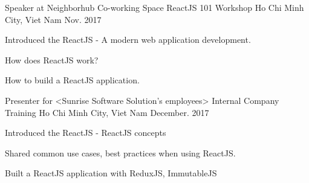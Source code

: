 

\begin{cventries}

  \cventry
    {Speaker at Neighborhub Co-working Space} %
    {ReactJS 101 Workshop} %
    {Ho Chi Minh City, Viet Nam} %
    {Nov. 2017} %
    {
      \begin{cvitems} %
        \item {Introduced the ReactJS - A modern web application development.}
        \item {How does ReactJS work?}
        \item {How to build a ReactJS application.}
      \end{cvitems}
    }

  \cventry
    {Presenter for <Sunrise Software Solution's employees>} %
    {Internal Company Training} %
    {Ho Chi Minh City, Viet Nam} %
    {December. 2017} %
    {
      \begin{cvitems} %
        \item {Introduced the ReactJS - ReactJS concepts}
        \item {Shared common use cases, best practices when using ReactJS.}
        \item {Built a ReactJS application with ReduxJS, ImmutableJS}
      \end{cvitems}
    }

\end{cventries}

